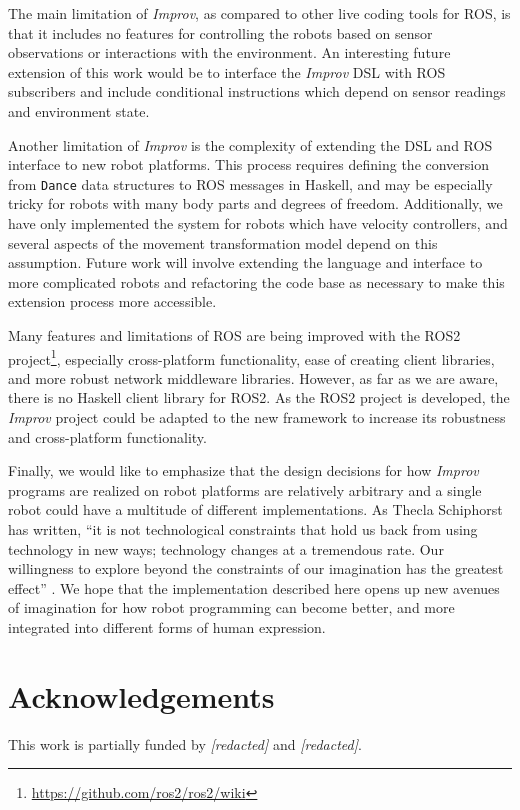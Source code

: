 \documentclass[sigconf]{acmart}
\begin{document}
The main limitation of \emph{Improv}, as compared to other live coding tools for
ROS, is that it includes no features for controlling the robots based on sensor
observations or interactions with the environment. An interesting future
extension of this work would be to interface the
\emph{Improv} DSL with ROS subscribers and include conditional
instructions which depend on sensor readings and environment state.

Another limitation of \emph{Improv} is the complexity of extending the DSL and
ROS interface to new robot platforms. This process requires defining the
conversion from \texttt{Dance} data structures to ROS messages in Haskell, and may be
especially tricky for robots with many body parts and degrees of freedom.
Additionally, we have only implemented the system for robots which have velocity
controllers, and several aspects of the movement transformation model depend on
this assumption. Future work will involve extending the language and interface
to more complicated robots and refactoring the code base as necessary to make
this extension process more accessible.

Many features and limitations of ROS are being improved with the ROS2
project\footnote{\url{https://github.com/ros2/ros2/wiki}},
especially cross-platform functionality, ease of creating client libraries, and
more robust network middleware libraries. However, as far as we are aware, there
is no Haskell client library for ROS2. As the ROS2 project is developed, the
\emph{Improv} project could be adapted to the new framework to increase its
robustness and cross-platform functionality.

Finally, we would like to emphasize that the design decisions for how
\emph{Improv} programs are realized on robot platforms are relatively arbitrary
and a single robot could have a multitude of different implementations. As
Thecla Schiphorst has written, ``it is not technological constraints that hold
us back from using technology in new ways; technology changes at a tremendous
rate. Our willingness to explore beyond the constraints of our imagination has
the greatest effect'' \cite{schiphorst}. We hope that the implementation
described here opens up new avenues of imagination for how robot programming can
become better, and more integrated into different forms of human expression.

\section{Acknowledgements}

This work is partially funded by \emph{[redacted]} and \emph{[redacted]}.




\end{document}
